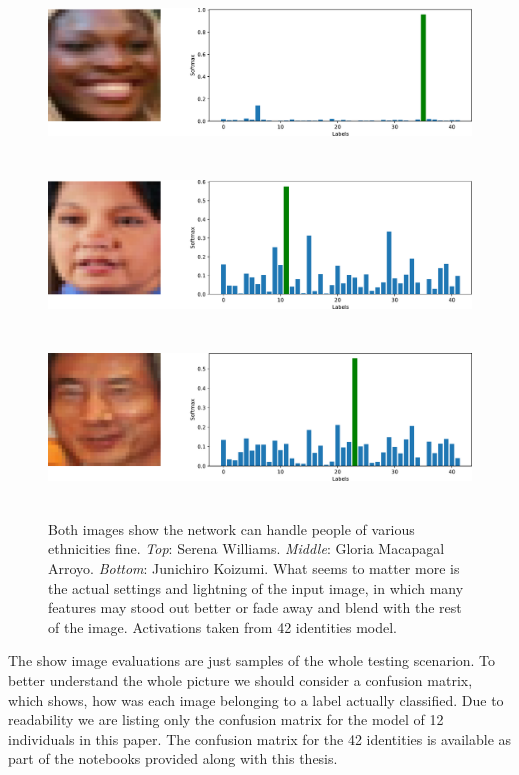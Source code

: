 \begin{figure}[ht]
    \centering
    \includegraphics[height=12em]{obrazky-figures/predicted_316_ok.pdf}
    \vspace{1em}
    \includegraphics[height=12em]{obrazky-figures/predicted_218_ok.pdf}
    \vspace{1em}
    \includegraphics[height=12em]{obrazky-figures/predicted_255_ok.pdf}
    \caption{Both images show the network can handle people of various ethnicities fine. \textit{Top}: Serena Williams. \textit{Middle}: Gloria Macapagal Arroyo. \textit{Bottom}: Junichiro Koizumi. What seems to matter more is the actual settings and lightning of the input image, in which many features may stood out better or fade away and blend with the rest of the image. Activations taken from 42 identities model.}
    \label{fig:serena}
\end{figure}

The show image evaluations are just samples of the whole testing scenarion. To better understand the whole picture we should consider a confusion matrix, which shows, how was each image belonging to a label actually classified. Due to readability we are listing only the confusion matrix for the model of 12 individuals in this paper. The confusion matrix for the 42 identities is available as part of the notebooks provided along with this thesis.

